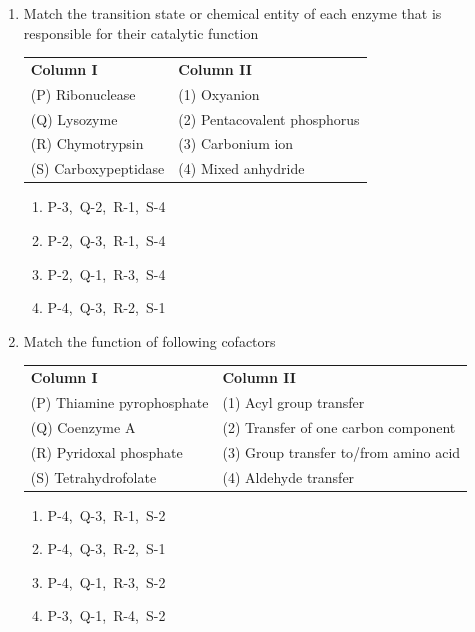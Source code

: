 \documentclass[journal,12pt,onecolumn]{IEEEtran}
\begin{document}
\begin{enumerate}
\item Match the transition state or chemical entity of each enzyme that is responsible for their catalytic function

\noindent
\begin{tabular}{p{5cm} p{5cm}}
\textbf{Column I} & \textbf{Column II} \\
(P) Ribonuclease & (1) Oxyanion \\
(Q) Lysozyme & (2) Pentacovalent phosphorus \\
(R) Chymotrypsin & (3) Carbonium ion \\
(S) Carboxypeptidase & (4) Mixed anhydride
\end{tabular}

\begin{multicols}{2}
\begin{enumerate}[label=(\Alph*)]
\item P-3,\ Q-2,\ R-1,\ S-4
\item  P-2,\ Q-3,\ R-1,\ S-4
\item   P-2,\ Q-1,\ R-3,\ S-4
\item    P-4,\ Q-3,\ R-2,\ S-1
\end{enumerate}
\end{multicols}

\item Match the function of following cofactors

\noindent
\begin{tabular}{p{6cm} p{7cm}}
\textbf{Column I} & \textbf{Column II} \\
(P) Thiamine pyrophosphate & (1) Acyl group transfer \\
(Q) Coenzyme A & (2) Transfer of one carbon component \\
(R) Pyridoxal phosphate & (3) Group transfer to/from amino acid \\
(S) Tetrahydrofolate & (4) Aldehyde transfer
\end{tabular}

\begin{multicols}{2}
\begin{enumerate}[label=(\Alph*)]
\item P-4,\ Q-3,\ R-1,\ S-2
\item  P-4,\ Q-3,\ R-2,\ S-1
\item   P-4,\ Q-1,\ R-3,\ S-2
\item    P-3,\ Q-1,\ R-4,\ S-2
\end{enumerate}
\end{multicols}


\end{enumerate}
\end{document}
